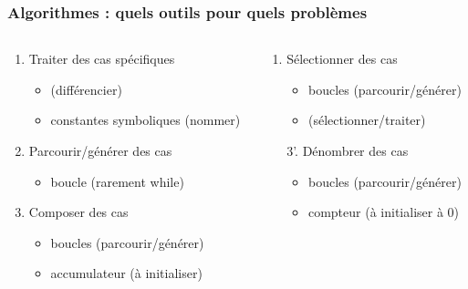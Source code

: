 \documentclass[xcolor=pdftex,svgnames,table]{beamer}
\begin{document}
\begin{frame}
  \frametitle{Algorithmes : quels outils pour quels problèmes\nowrite}
\pause
\begin{columns}
 \begin{column}[t]{0.59\linewidth}
  \begin{enumerate}
    \item  Traiter des cas spécifiques 
      \begin{itemize}
      \item \alert{} (différencier)
      \item \alert{} constantes symboliques (nommer)
     \end{itemize}\pause
    \item Parcourir/générer des cas\pause
      \begin{itemize}
      \item \alert{boucle } (rarement while)
      \end{itemize}\pause
   \item Composer des cas
      \begin{itemize}
        \item boucles (parcourir/générer)
        \pause
      \item \alert{accumulateur} (à initialiser)
      \end{itemize}\pause
\setcounter{savedenumi}{\value{enumi}}
\end{enumerate}
\end{column}\hspace{-1cm}
\pause
\begin{column}[t]{0.59\linewidth}
\begin{enumerate}
\setcounter{enumi}{\value{savedenumi}}
   \item Sélectionner des cas
      \begin{itemize}
        \item boucles (parcourir/générer)
        \item \alert{}  (sélectionner/traiter)
      \end{itemize}\pause
    \item[3'.] Dénombrer des cas
      \begin{itemize}
        \item boucles (parcourir/générer)
          \pause
        \item \alert{compteur} (à initialiser à 0)

\end{itemize}
\end{enumerate}
\end{column}
\end{columns}
\end{frame}
\end{document}
